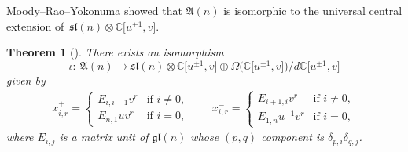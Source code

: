 \documentclass[pdftex]{sigma}
\numberwithin{equation}{section}
\newtheorem{Theorem}{Theorem}[section]
\theoremstyle{definition}
\begin{document}
Moody--Rao--Yokonuma showed that $\mathfrak{A}(n)$ is isomorphic to the universal central extension of~$\mathfrak{sl}(n)\otimes\mathbb{C}\bigl[u^{\pm1},v\bigr]$.
\begin{Theorem}[{\cite[Proposition 3.5]{MRY}}]
There exists an isomorphism
\begin{equation*}
\iota\colon\ \mathfrak{A}(n)\to \mathfrak{sl}(n)\otimes\mathbb{C}\bigl[u^{\pm1},v\bigr]\oplus\Omega\bigl(\mathbb{C}\bigl[u^{\pm1},v\bigr]\bigr)/d\mathbb{C}\bigl[u^{\pm1},v\bigr]
\end{equation*}
given by
\begin{gather*}
x^+_{i,r}=\begin{cases}
E_{i,i+1}v^r&\text{if }i\neq0,\\
E_{n,1}uv^r&\text{if }i=0,
\end{cases}\qquad
x^-_{i,r}=\begin{cases}
E_{i+1,i}v^r&\text{if }i\neq0,\\
E_{1,n}u^{-1}v^r&\text{if }i=0,
\end{cases}
\end{gather*}
where $E_{i,j}$ is a matrix unit of $\mathfrak{gl}(n)$ whose $(p,q)$ component is $\delta_{p,i}\delta_{q,j}$.
\end{Theorem}
\end{document}

